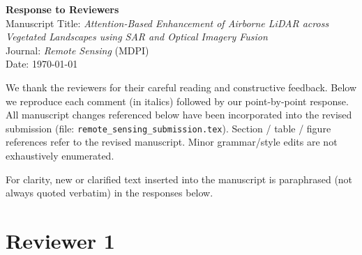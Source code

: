 \documentclass[11pt]{article}
\begin{document}
\begin{center}
{\Large \textbf{Response to Reviewers}}\\[4pt]
Manuscript Title: \emph{Attention-Based Enhancement of Airborne LiDAR across Vegetated Landscapes using SAR and Optical Imagery Fusion}\\[2pt]
Journal: \emph{Remote Sensing} (MDPI)\\[2pt]
Date: \today
\end{center}

We thank the reviewers for their careful reading and constructive feedback. Below we reproduce each comment (in italics) followed by our point-by-point response. All manuscript changes referenced below have been incorporated into the revised submission (file: \texttt{remote\_sensing\_submission.tex}). Section / table / figure references refer to the revised manuscript. Minor grammar/style edits are not exhaustively enumerated.

For clarity, new or clarified text inserted into the manuscript is paraphrased (not always quoted verbatim) in the responses below.

\section*{Reviewer 1}
\end{document}
